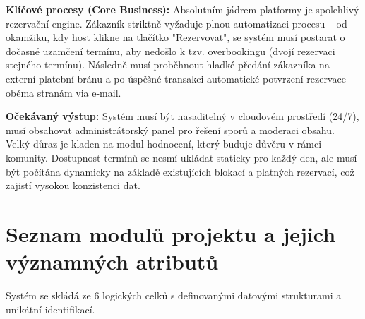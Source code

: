 \documentclass[11pt, a4paper]{article}
\begin{document}
\vspace{0.3cm}
\noindent \textbf{Klíčové procesy (Core Business):}
Absolutním jádrem platformy je spolehlivý rezervační engine. Zákazník striktně vyžaduje plnou automatizaci procesu -- od okamžiku, kdy host klikne na tlačítko "Rezervovat", se systém musí postarat o dočasné uzamčení termínu, aby nedošlo k tzv. overbookingu (dvojí rezervaci stejného termínu). Následně musí proběhnout hladké předání zákazníka na externí platební bránu a po úspěšné transakci automatické potvrzení rezervace oběma stranám via e-mail.

\vspace{0.3cm}
\noindent \textbf{Očekávaný výstup:}
Systém musí být nasaditelný v cloudovém prostředí (24/7), musí obsahovat administrátorský panel pro řešení sporů a moderaci obsahu. Velký důraz je kladen na modul hodnocení, který buduje důvěru v rámci komunity. Dostupnost termínů se nesmí ukládat staticky pro každý den, ale musí být počítána dynamicky na základě existujících blokací a platných rezervací, což zajistí vysokou konzistenci dat.

\section{Seznam modulů projektu a jejich významných atributů}
Systém se skládá ze 6 logických celků s definovanými datovými strukturami a unikátní identifikací.
\end{document}
